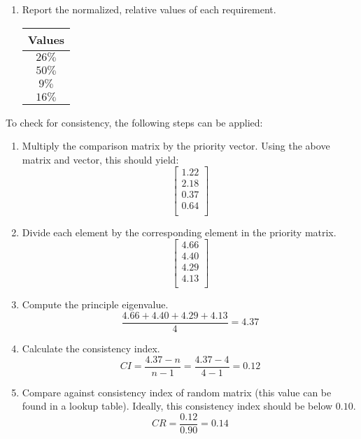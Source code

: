 \documentclass[12pt,titlepage]{article}
\begin{document}
\begin{enumerate}
          \item Report the normalized, relative values of each requirement.
            \begin{center}
              \begin{tabular}{ |c| } 
                \hline
                Values \\
                \hline
                $26\%$ \\
                \hline
                $50\%$ \\
                \hline
                $9\%$ \\
                \hline
                $16\%$ \\
                \hline
              \end{tabular}
            \end{center}
        \end{enumerate}

        To check for consistency, the following steps can be applied:
          \begin{enumerate}
            \item Multiply the comparison matrix by the priority vector. Using the above matrix and vector, this should yield:
            $$
              \begin{bmatrix}
                1.22 \\
                2.18 \\
                0.37 \\
                0.64 \\
              \end{bmatrix}
            $$

            \item Divide each element by the corresponding element in the priority matrix.
            $$
              \begin{bmatrix}
                4.66 \\
                4.40 \\
                4.29 \\
                4.13 \\
              \end{bmatrix}
            $$

            \item Compute the principle eigenvalue.
            $$
              \frac{4.66 + 4.40 + 4.29 + 4.13}{4} = 4.37
            $$

            \item Calculate the consistency index.
            $$
              CI = \frac{4.37 - n}{n - 1} = \frac{4.37 - 4}{4 - 1} = 0.12
            $$

            \item Compare against consistency index of random matrix (this value can be found in a lookup table). Ideally, this consistency index should
              be below $0.10$.
            $$
              CR = \frac{0.12}{0.90} = 0.14
            $$
          \end{enumerate}
\end{document}
